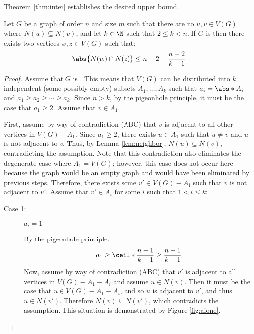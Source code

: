 Theorem \ref{thm:inter} establishes the desired upper bound.

\begin{theorem}
  \label{thm:inter}
  Let \(G\) be a graph of order \(n\) and size \(m\) such that there are no \(u,v\in V(G)\) where \(N(u)\subseteq
  N(v)\), and let \(k\in\N\) such that \(2\le k<n\).  If \(G\) is  then there exists two vertices
  \(w,z\in V(G)\) such that:
  \[\abs{N(w)\cap N(z)}\le n-2-\frac{n-2}{k-1}\]
\end{theorem}

\begin{proof}
  Assume that \(G\) is .  This means that \(V(G)\) can be distributed into \(k\) independent (some
  possibly empty) subsets \(A_1,\ldots,A_k\) such that \(a_i=\abs*{A_i}\) and \(a_1\ge a_2\ge\cdots\ge a_k\).
  Since \(n>k\), by the pigeonhole principle, it must be the case that \(a_1\ge2\).  Assume that \(v\in A_1\).

  First, assume by way of contradiction (ABC) that \(v\) is adjacent to all other vertices in \(V(G)-A_1\).  Since
  \(a_1\ge2\), there exists \(u\in A_1\) such that \(u\ne v\) and \(u\) is not adjacent to \(v\).  Thus, by Lemma
  \ref{lem:neighbor}, \(N(u)\subseteq N(v)\), contradicting the assumption.  Note that this contradiction also
  eliminates the degenerate case where \(A_1=V(G)\); however, this case does not occur here because the graph would
  be an empty graph and would have been eliminated by previous steps.  Therefore, there exists some \(v'\in
  V(G)-A_1\) such that \(v\) is not adjacent to \(v'\).  Assume that \(v'\in A_i\) for some \(i\) such that
  \(1<i\le k\):

  \begin{description}
  \item [Case 1:] \(a_i=1\)

    By the pigeonhole principle:
    \[a_1\ge\ceil*{\frac{n-1}{k-1}}\ge\frac{n-1}{k-1}\]
    Now, assume by way of contradiction (ABC) that \(v'\) is adjacent to all vertices in \(V(G)-A_1-A_i\) and
    assume \(u\in N(v)\).  Then it must be the case that \(u\in V(G)-A_1-A_i\), and so \(u\) is adjacent to \(v'\),
    and thus \(u\in N(v')\).  Therefore \(N(v)\subseteq N(v')\), which contradicts the assumption.  This situation
    is demonstrated by Figure \ref{fig:aione}.


\end{description}
\end{proof}
